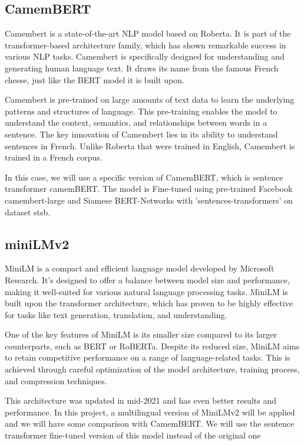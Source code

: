 \subsection{CamemBERT}

Camembert is a state-of-the-art NLP model based on Roberta. It is part of the transformer-based architecture family, which has shown remarkable success in various NLP tasks. Camembert is specifically designed for understanding and generating human language text. It draws its name from the famous French cheese, just like the BERT model it is built upon.

Camembert is pre-trained on large amounts of text data to learn the underlying patterns and structures of language. This pre-training enables the model to understand the context, semantics, and relationships between words in a sentence. The key innovation of Camembert lies in its ability to understand sentences in French. Unlike Roberta that were trained in English, Camembert is trained in a French corpus.

In this case, we will use a specific version of CamemBERT, which is sentence transformer camemBERT. The model is Fine-tuned using pre-trained Facebook camembert-large and Siamese BERT-Networks with 'sentences-transformers' on dataset stsb.

\subsection{miniLMv2}

MiniLM is a compact and efficient language model developed by Microsoft Research. It's designed to offer a balance between model size and performance, making it well-suited for various natural language processing tasks. MiniLM is built upon the transformer architecture, which has proven to be highly effective for tasks like text generation, translation, and understanding.

One of the key features of MiniLM is its smaller size compared to its larger counterparts, such as BERT or RoBERTa. Despite its reduced size, MiniLM aims to retain competitive performance on a range of language-related tasks. This is achieved through careful optimization of the model architecture, training process, and compression techniques.

This architecture was updated in mid-2021 and has even better results and performance. In this project, a multilingual version of MiniLMv2 will be applied and we will have some comparison with CamemBERT. We will use the sentence transformer fine-tuned version of this model instead of the original one

